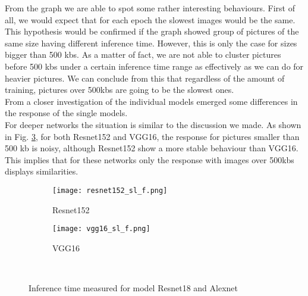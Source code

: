 From the graph we are able to spot some rather interesting behaviours. First of all, we would expect that for each epoch the slowest images would be the same. This hypothesis would be confirmed if the graph showed group of pictures of the same size having different inference time. However, this is only the case for sizes bigger than 500 kbs. As a matter of fact, we are not able to cluster pictures before 500 kbs under a certain inference time range as effectively as we can do for heavier pictures. We can conclude from this that regardless of the amount of training, pictures over 500kbs are going to be the slowest ones. \\
From a closer investigation of the individual models emerged some differences in the response of the single models. \\
For deeper networks the situation is similar to the discussion we made. As shown in Fig. \ref{fig:sl_f_deep}, for both Resnet152 and VGG16, the response for pictures smaller than 500 kb is noisy, although Resnet152 show a more stable behaviour than VGG16. This implies that for these networks only the response with images over 500kbs displays similarities.  
\begin{figure}[h]
     \begin{subfigure}{0.5\textwidth}
	    \texttt{[image: resnet152\_sl\_f.png]}
	    \caption{Resnet152}
         \label{fig:resnet152_sl_f}
         
     \end{subfigure}
     \hfill
     \begin{subfigure}{0.5\textwidth}
	    \texttt{[image: vgg16\_sl\_f.png]}
	    \caption{VGG16}
        \label{fig:vgg16_sl_f}
        
     \end{subfigure}\\
     \caption{Inference time measured for model Resnet18 and Alexnet}
        \label{fig:sl_f_deep}
\end{figure}

